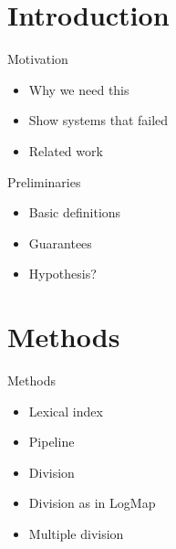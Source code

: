 \documentclass[t]{beamer}
\title{}
\subtitle{We Divide, You Conquer: From Large-scale Ontology Alignment to Manageable Subtasks}
\date{October 8, 2018}
\author{\textbf{Ernesto Jimenez-Ruiz}, Asan Agibetov, Matthias Samwald, Valerie Cross}
\begin{document}
\begin{frame}
	\titlepage
\end{frame}


\section{Introduction}



\begin{frame}{Motivation}
	
  		\begin{itemize}    
  			\item Why we need this
  			\item Show systems that failed
  			\item Related work
		\end{itemize}
  	
\end{frame}


\begin{frame}{Preliminaries}
	
  		\begin{itemize}    
  			\item Basic definitions
  			\item Guarantees
  			\item Hypothesis?
		\end{itemize}
  	
\end{frame}


\section{Methods}


\begin{frame}{Methods}
	
  		\begin{itemize}    
  			\item Lexical index
  			\item Pipeline
  			\item Division
  			\item Division as in LogMap
  			\item Multiple division
		\end{itemize}
  	
\end{frame}
\end{document}

